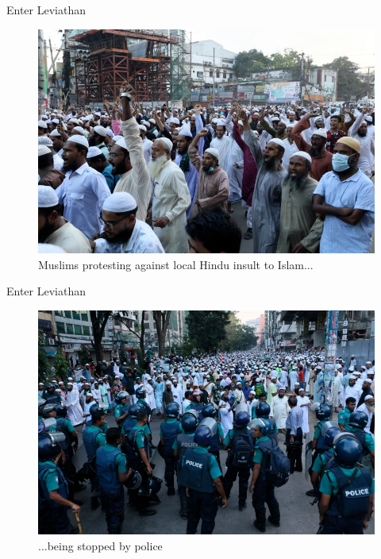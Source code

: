 \documentclass{beamer}
\begin{document}
\begin{frame}{Enter Leviathan}

\begin{figure}[htpb]
	\centering
	\includegraphics[width=0.8\linewidth]{img/ap.png}
	\caption{Muslims protesting against local Hindu insult to Islam...}%
	\label{ap}
\end{figure}	

\end{frame}

\begin{frame}{Enter Leviathan}

\begin{figure}[htpb]
	\centering
	\includegraphics[width=0.8\linewidth]{img/AP.png}
	\caption{...being stopped by police}%
	\label{AP}
\end{figure}	

\end{frame}
\end{document}
